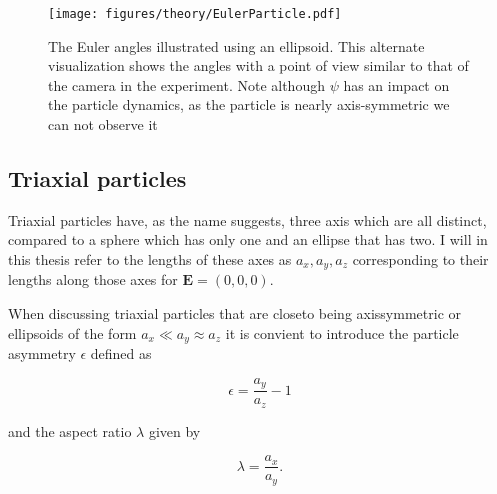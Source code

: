 \begin{figure}[H]
\begin{center}
\texttt{[image: figures/theory/EulerParticle.pdf]}
\end{center}
\caption{The Euler angles illustrated using an ellipsoid. This alternate visualization shows the angles with a point of view similar to that of the camera in the experiment. Note although $\psi$ has an impact on the particle dynamics, as the particle is nearly axis-symmetric we can not observe it}
\label{fig:eulerparticle}
\end{figure}


\subsection{Triaxial particles}
Triaxial particles have, as the name suggests, three axis which are all distinct, compared to a sphere which has only one and an ellipse that has two. I will in this thesis refer to the lengths of these axes as $a_x, a_y, a_z$ corresponding to their lengths along those axes for $\mathbf{E} = (0,0,0)$. 

When discussing triaxial particles that are closeto being axissymmetric or ellipsoids of the form $a_x \ll a_y \approx a_z$ it is convient to introduce the particle asymmetry $\epsilon$ defined as

\begin{equation}\label{eq:epsilon}
\epsilon = \frac{a_y}{a_z} - 1
\end{equation}

and the aspect ratio $\lambda$ given by

\begin{equation}\label{eq:lambda}
\lambda = \frac{a_x}{a_y}.
\end{equation}





